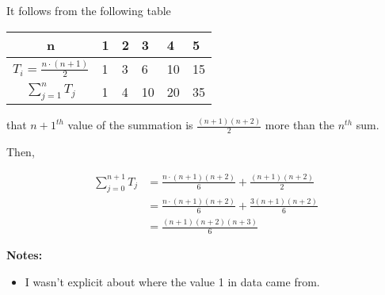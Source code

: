 \documentclass[12pt]{article}
\begin{document}
\begin{itemize}
\begin{mdframed}
        \bigskip

        It follows from the following table

        \begin{tabularx}{\textwidth}{|c|X|X|X|X|X|}
            \hline
            n & 1 & 2 & 3 & 4 & 5\\
            \hline
            $T_i = \frac{n \cdot (n+1)}{2}$ & 1 & 3 & 6 & 10 & 15\\
            \hline
            $\sum\limits_{j=1}^n T_j$ & 1 & 4 & 10 & 20 & 35\\
            \hline
        \end{tabularx}

        that $n+1^{th}$ value of the summation is $\frac{(n+1)(n+2)}{2}$ more than
        the $n^{th}$ sum.

        \bigskip

        Then,

        \begin{align}
            \sum\limits_{j=0}^{n+1} T_j &= \frac{n \cdot (n+1)(n+2)}{6} + \frac{(n+1)(n+2)}{2}\\
            &= \frac{n \cdot (n+1)(n+2)}{6} + \frac{3(n+1)(n+2)}{6}\\
            &= \frac{(n+1)(n+2)(n+3)}{6}
        \end{align}

    \end{mdframed}

    \bigskip

    \textbf{Notes:}
    \begin{itemize}
        \item I wasn't explicit about where the value 1 in data came from.
    \end{itemize}

\end{itemize}
\end{document}
